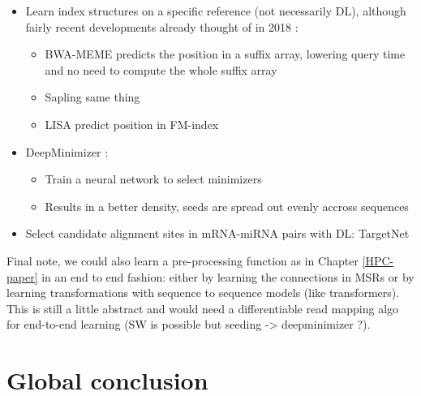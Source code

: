 \documentclass[
  11pt,
  twoside,
  BCOR=10mm,
  listof=totoc]{scrbook}
\begin{document}
\begin{itemize}
\item
  Learn index structures on a specific reference (not necessarily DL), although fairly recent developments already thought of in 2018 \autocite{kraskaCaseLearnedIndex2018}:

  \begin{itemize}
  \item
    BWA-MEME \autocite{jungBWAMEMEBWAMEMEmulated2022} predicts the position in a suffix array, lowering query time and no need to compute the whole suffix array
  \item
    Sapling \autocite{kirscheSaplingAcceleratingSuffix2021} same thing
  \item
    LISA \autocite{hoLISALearnedIndexes2021} predict position in FM-index
  \end{itemize}
\end{itemize}

\begin{itemize}
\item
  DeepMinimizer \autocite{hoangDifferentiableLearningSequenceSpecific2022}:

  \begin{itemize}
  \item
    Train a neural network to select minimizers
  \item
    Results in a better density, seeds are spread out evenly accross sequences
  \end{itemize}
\item
  Select candidate alignment sites in mRNA-miRNA pairs with DL: TargetNet \autocite{minTargetNetFunctionalMicroRNA2022}
\end{itemize}

Final note, we could also learn a pre-processing function as in Chapter \ref{HPC-paper} in an end to end fashion: either by learning the connections in MSRs or by learning transformations with sequence to sequence models (like transformers). This is still a little abstract and would need a differentiable read mapping algo for end-to-end learning (SW is possible but seeding -\textgreater{} deepminimizer ?).

\printbibliography[segment=\therefsegment,heading=subbibintoc,title={References for chapter \thechapter}]

\hypertarget{global-conclusion}{%
\chapter*{Global conclusion}\label{global-conclusion}}
\end{document}
